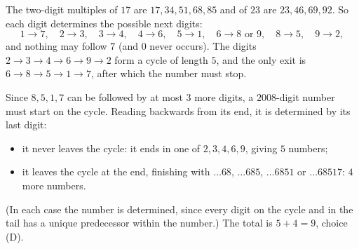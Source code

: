 The two-digit multiples of $17$ are $17,34,51,68,85$ and of $23$ are $23,46,69,92$. So each digit determines the possible next digits:
\[
1\to7,\quad 2\to3,\quad 3\to4,\quad 4\to6,\quad 5\to1,\quad 6\to8\text{ or }9,\quad 8\to5,\quad 9\to2,
\]
and nothing may follow $7$ (and $0$ never occurs). The digits $2\to3\to4\to6\to9\to2$ form a cycle of length $5$, and the only exit is $6\to8\to5\to1\to7$, after which the number must stop.

Since $8,5,1,7$ can be followed by at most $3$ more digits, a $2008$-digit number must start on the cycle. Reading backwards from its end, it is determined by its last digit:
\begin{itemize}
\item it never leaves the cycle: it ends in one of $2,3,4,6,9$, giving $5$ numbers;
\item it leaves the cycle at the end, finishing with $\dots68$, $\dots685$, $\dots6851$ or $\dots68517$: $4$ more numbers.
\end{itemize}
(In each case the number is determined, since every digit on the cycle and in the tail has a unique predecessor within the number.) The total is $5+4=\boxed{9}$, choice (D).
